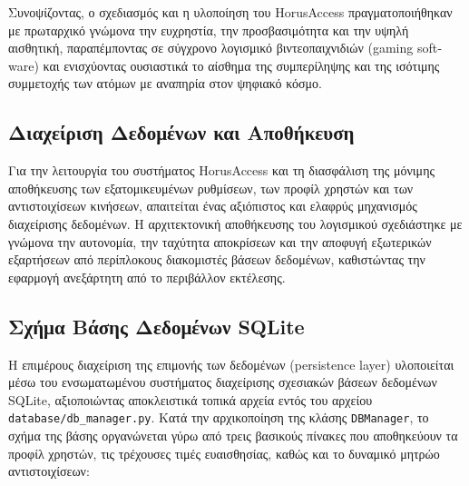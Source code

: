 \documentclass[twoside, a4paper, 11pt]{article}
\newcommand{\textlatin}[1]{\textenglish{#1}}
\begin{document}
Συνοψίζοντας, ο σχεδιασμός και η υλοποίηση του \textlatin{HorusAccess} πραγματοποιήθηκαν με πρωταρχικό γνώμονα την ευχρηστία, την προσβασιμότητα και την υψηλή αισθητική, παραπέμποντας σε σύγχρονο λογισμικό βιντεοπαιχνιδιών (\textlatin{gaming software}) και ενισχύοντας ουσιαστικά το αίσθημα της συμπερίληψης και της ισότιμης συμμετοχής των ατόμων με αναπηρία στον ψηφιακό κόσμο.

\subsection{Διαχείριση Δεδομένων και Αποθήκευση}

Για την λειτουργία του συστήματος \textlatin{HorusAccess} και τη διασφάλιση της μόνιμης αποθήκευσης των εξατομικευμένων ρυθμίσεων, των προφίλ χρηστών και των αντιστοιχίσεων κινήσεων, απαιτείται ένας αξιόπιστος και ελαφρύς μηχανισμός διαχείρισης δεδομένων. Η αρχιτεκτονική αποθήκευσης του λογισμικού σχεδιάστηκε με γνώμονα την αυτονομία, την ταχύτητα αποκρίσεων και την αποφυγή εξωτερικών εξαρτήσεων από περίπλοκους διακομιστές βάσεων δεδομένων, καθιστώντας την εφαρμογή ανεξάρτητη από το περιβάλλον εκτέλεσης.

\subsection{Σχήμα Βάσης Δεδομένων SQLite}

Η επιμέρους διαχείριση της επιμονής των δεδομένων (\textlatin{persistence layer}) υλοποιείται μέσω του ενσωματωμένου συστήματος διαχείρισης σχεσιακών βάσεων δεδομένων \textlatin{SQLite}, αξιοποιώντας αποκλειστικά τοπικά αρχεία εντός του αρχείου \texttt{database/db\_manager.py}. Κατά την αρχικοποίηση της κλάσης \texttt{DBManager}, το σχήμα της βάσης οργανώνεται γύρω από τρεις βασικούς πίνακες που αποθηκεύουν τα προφίλ χρηστών, τις τρέχουσες τιμές ευαισθησίας, καθώς και το δυναμικό μητρώο αντιστοιχίσεων:
\end{document}

